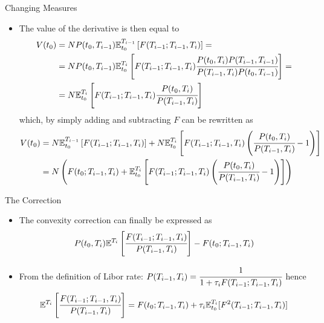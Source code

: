 \documentclass{beamer}
\begin{document}
\begin{frame}{Changing Measures}
\begin{itemize}
\item The value of the derivative is then equal to
\begin{equation*}
\begin{aligned}
V(t_0) &= N P(t_0,T_{i-1})\mathbb{E}^{T_{i-1}}_{t_0}\left[F(T_{i-1};T_{i-1},T_i)\right] = \\
&=N P(t_0,T_{i-1})\mathbb{E}^{T_i}_{t_0}\left[F(T_{i-1};T_{i-1},T_i)\cfrac{P(t_0,T_i)P(T_{i-1},T_{i-1})}{P(T_{i-1},T_i)P(t_0,T_{i-1})}\right]=\\
&=N \mathbb{E}^{T_i}_{t_0}\left[F(T_{i-1};T_{i-1},T_i)\cfrac{P(t_0,T_i)}{P(T_{i-1}, T_i)}\right]\\
\end{aligned}
\end{equation*}
which, by simply adding and subtracting $F$ can be rewritten as 
\begin{equation*}
\begin{aligned}
V(t_0) &= N \mathbb{E}^{T_{i-1}}_{t_0}\left[F(T_{i-1};T_{i-1},T_i)\right] + N \mathbb{E}^{T_i}_{t_0}\left[F(T_{i-1};T_{i-1},T_i)\left(\cfrac{P(t_0,T_i)}{P(T_{i-1}, T_i)}-1\right)\right]\\
&=N\left(F(t_0;T_{i-1},T_i) + \mathbb{E}^{T_i}_{t_0}\left[F(T_{i-1};T_{i-1},T_i)\left(\cfrac{P(t_0,T_i)}{P(T_{i-1}, T_i)}-1\right)\right]\right)
\end{aligned}
\end{equation*}
\end{itemize}
\end{frame}

\begin{frame}{The Correction}
\begin{itemize}
\item The convexity correction can finally be expressed as
\begin{equation}
P(t_0,T_i)\mathbb{E}^{T_i}\left[\cfrac{F(T_{i-1};T_{i-1},T_i)}{P(T_{i-1},T_i)}\right]-F(t_0;T_{i-1},T_i)
\end{equation}
\item From the definition of Libor rate: $P(T_{i-1},T_i)=\cfrac{1}{1+\tau_i F(T_{i-1};T_{i-1},T_i)}$ hence
\begin{equation*}
\mathbb{E}^{T_i}\left[\cfrac{F(T_{i-1};T_{i-1},T_i)}{P(T_{i-1},T_i)}\right]=F(t_0;T_{i-1},T_i)+\tau_i\mathbb{E}^{T_i}_{t_0}[F^2(T_{i-1};T_{i-1},T_i)]
\end{equation*}
\end{itemize}
\end{frame}
\end{document}
